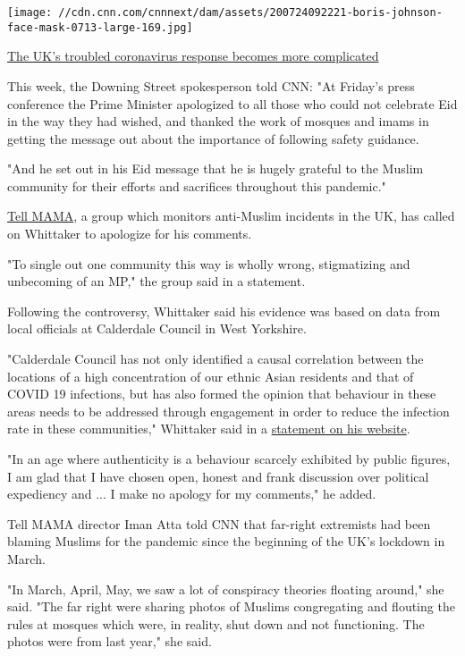 \href{/2020/08/03/uk/covid-capital-of-europe-reopens-amid-confusion-and-chaos-intl-gbr/index.html}{}

\texttt{[image: //cdn.cnn.com/cnnnext/dam/assets/200724092221-boris-johnson-face-mask-0713-large-169.jpg]}

\href{/2020/08/03/uk/covid-capital-of-europe-reopens-amid-confusion-and-chaos-intl-gbr/index.html}{The
UK's troubled coronavirus response becomes more complicated}

This week, the Downing Street spokesperson told CNN: "At Friday's press
conference the Prime Minister apologized to all those who could not
celebrate Eid in the way they had wished, and thanked the work of
mosques and imams in getting the message out about the importance of
following safety guidance.

"And he set out in his Eid message that he is hugely grateful to the
Muslim community for their efforts and sacrifices throughout this
pandemic."

\href{https://tellmamauk.org/}{Tell MAMA}, a group which monitors
anti-Muslim incidents in the UK, has called on Whittaker to apologize
for his comments.

"To single out one community this way is wholly wrong, stigmatizing and
unbecoming of an MP," the group said in a statement.

Following the controversy, Whittaker said his evidence was based on data
from local officials at Calderdale Council in West Yorkshire.

"Calderdale Council has not only identified a causal correlation between
the locations of a high concentration of our ethnic Asian residents and
that of COVID 19 infections, but has also formed the opinion that
behaviour in these areas needs to be addressed through engagement in
order to reduce the infection rate in these communities," Whittaker said
in a
\href{https://www.craigwhittaker.org.uk/news/lbc-radio-interview}{statement
on his website}.

"In an age where authenticity is a behaviour scarcely exhibited by
public figures, I am glad that I have chosen open, honest and frank
discussion over political expediency and ... I make no apology for my
comments," he added.

Tell MAMA director Iman Atta told CNN that far-right extremists had been
blaming Muslims for the pandemic since the beginning of the UK's
lockdown in March.

"In March, April, May, we saw a lot of conspiracy theories floating
around," she said. "The far right were sharing photos of Muslims
congregating and flouting the rules at mosques which were, in reality,
shut down and not functioning. The photos were from last year," she
said.

